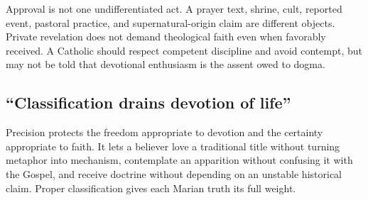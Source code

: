 Approval is not one undifferentiated act. A prayer text, shrine, cult, reported
event, pastoral practice, and supernatural-origin claim are different objects.
Private revelation does not demand theological faith even when favorably
received. A Catholic should respect competent discipline and avoid contempt,
but may not be told that devotional enthusiasm is the assent owed to dogma.

\subsection{``Classification drains devotion of life''}

Precision protects the freedom appropriate to devotion and the certainty
appropriate to faith. It lets a believer love a traditional title without
turning metaphor into mechanism, contemplate an apparition without confusing
it with the Gospel, and receive doctrine without depending on an unstable
historical claim. Proper classification gives each Marian truth its full
weight.


